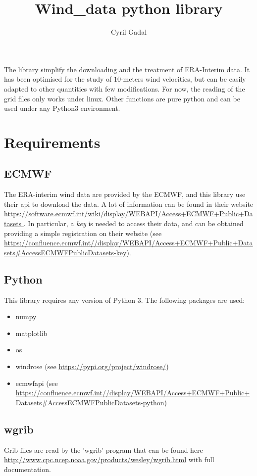 \documentclass[12pt]{article}
\author{Cyril Gadal}
\title{Wind\_data python library}
\begin{document}
\maketitle	


The library simplify the downloading and the treatment of ERA-Interim data. It has been optimised for the study of $10$-meters wind velocities, but can be easily adapted to other quantities with few modifications. For now, the reading of the grid files only works under linux. Other functions are pure python and can be used under any Python3 environment.

\section{Requirements}
\subsection{ECMWF}
The ERA-interim wind data are provided by the ECMWF, and this library use their api to download the data. A lot of information can be found in their website \url{https://software.ecmwf.int/wiki/display/WEBAPI/Access+ECMWF+Public+Datasets
}. In particular, a \emph{key} is needed to access their data, and can be obtained providing a simple registration on their website (see \url{https://confluence.ecmwf.int//display/WEBAPI/Access+ECMWF+Public+Datasets#AccessECMWFPublicDatasets-key}).

\subsection{Python}
This library requires any version of Python 3. The following packages are used:
\begin{itemize}
\item numpy
\item matplotlib
\item os 
\item windrose (see \url{https://pypi.org/project/windrose/})
\item ecmwfapi (see \url{https://confluence.ecmwf.int//display/WEBAPI/Access+ECMWF+Public+Datasets#AccessECMWFPublicDatasets-python})
\end{itemize}

\subsection{wgrib}
Grib files are read by the 'wgrib' program that can be found here \url{http://www.cpc.ncep.noaa.gov/products/wesley/wgrib.html} with full documentation.
\end{document}
